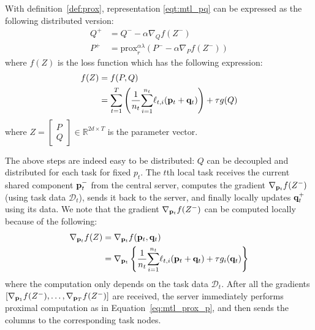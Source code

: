 With definition~\ref{def:prox}, representation \ref{eqt:mtl_pq} can be expressed as the following distributed version:
\begin{align}
Q^+ &= Q^- - \alpha \nabla_Q f(Z^-)
    \label{eq:mtl_prox_q}\\
P^+ &= \text{prox}_{r}^{\alpha\lambda}(P^- - \alpha \nabla_P f(Z^-))
    \label{eq:mtl_prox_p}
\end{align}
where $f(Z)$ is the loss function which has the following expression:
\begin{align*}
\begin{split}
f(Z) &= f(P, Q)\\
&= \sum_{t=1}^T \left(\frac{1}{n_{t}}\displaystyle{\sum_{i=1}^{n_{t}}}
 \ell_{t,i}(\mathbf{p}_{t} + \mathbf{q}_{t})\right) + \tau g(Q)
\end{split}
\end{align*}
where $Z = \begin{bmatrix}
P \\ Q 
\end{bmatrix}  \in \mathbb R^{2d \times T}$
is the parameter vector.

The above steps are indeed easy to be distributed: $Q$ can be decoupled and distributed for each task for fixed $p_t$. The $t$th local task receives the current shared component $\mathbf{p}_t^-$ from the central server, computes
the gradient $\nabla_{\mathbf{p}_t} f(Z^-)$ (using task data $\mathcal D_t$), sends it back 
to the server, and finally locally updates $\mathbf{q}_t^+$ using its data. We note that 
the gradient $\nabla_{\mathbf{p}_t} f(Z^-)$ can be computed locally because of the following:
\begin{align*}
\begin{split}
\nabla_{\mathbf{p}_t}f(Z) &= \nabla_{\mathbf{p}_t}f(\mathbf{p}_t, \mathbf{q}_t) \\
&= 
\nabla_{\mathbf{p}_t} \left\{ \frac{1}{n_{t}}\displaystyle{\sum_{i=1}^{n_{t}}}
 \ell_{t,i}(\mathbf{p}_{t} + \mathbf{q}_{t}) + \tau g_i(\mathbf{q}_t) \right\}
\end{split}
\end{align*}
where the computation only depends on the task data $\mathcal D_t$. After all the gradients $[\nabla_{\mathbf{p}_1} f(Z^-), \dots,
\nabla_{\mathbf{p}_T} f(Z^-)]$ are received, the server immediately performs proximal computation
as in Equation~\eqref{eq:mtl_prox_p}, and then sends the columns to the corresponding
task nodes. 

